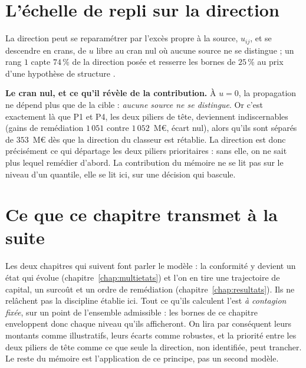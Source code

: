 \section{L'échelle de repli sur la direction}
\label{sec:echelle-u}

La direction peut se reparamétrer par l'excès propre à la source, $u_{ij}$, et se descendre en
crans, de $u$ libre au cran nul où aucune source ne se distingue ; un rang $1$ capte $74\,\%$ de la
direction posée et resserre les bornes de $25\,\%$ au prix d'une hypothèse de structure
\matcomp.

\begin{cle}
\textbf{Le cran nul, et ce qu'il révèle de la contribution.} À $u=0$, la propagation ne
dépend plus que de la cible : \emph{aucune source ne se distingue}. Or c'est exactement là
que P1 et P4, les deux piliers de tête, deviennent indiscernables (gains de
remédiation $1\,051$ contre $1\,052$~M\euro{}, écart nul), alors qu'ils sont séparés de
$353$~M\euro{} dès que la direction du classeur est rétablie. La direction est donc
précisément ce qui départage les deux piliers prioritaires : sans elle, on ne sait plus
lequel remédier d'abord. La contribution du mémoire ne se lit pas sur le niveau d'un
quantile, elle se lit ici, sur une décision qui bascule.
\end{cle}


\section*{Ce que ce chapitre transmet à la suite}

Les deux chapitres qui suivent font parler le modèle : la conformité y devient un état qui
évolue (chapitre~\ref{chap:multietats}) et l'on en tire une trajectoire de capital, un
surcoût et un ordre de remédiation (chapitre~\ref{chap:resultats}). Ils ne relâchent pas la
discipline établie ici. Tout ce qu'ils calculent l'est \emph{à contagion fixée}, sur un
point de l'ensemble admissible : les bornes de ce chapitre enveloppent donc chaque niveau
qu'ils afficheront. On lira par conséquent leurs montants comme illustratifs, leurs écarts
comme robustes, et la priorité entre les deux piliers de tête comme ce que seule la direction,
non identifiée, peut trancher. Le reste du mémoire est l'application de ce principe, pas un
second modèle.

